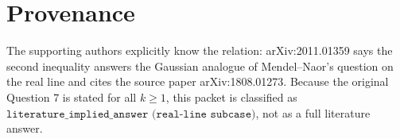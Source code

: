 \documentclass[11pt]{article}
\begin{document}
\section*{Provenance}

The supporting authors explicitly know the relation: arXiv:2011.01359 says the second inequality answers the Gaussian analogue of Mendel--Naor's question on the real line and cites the source paper arXiv:1808.01273. Because the original Question 7 is stated for all \(k\ge1\), this packet is classified as \(\texttt{literature\_implied\_answer (real-line subcase)}\), not as a full literature answer.
\end{document}
